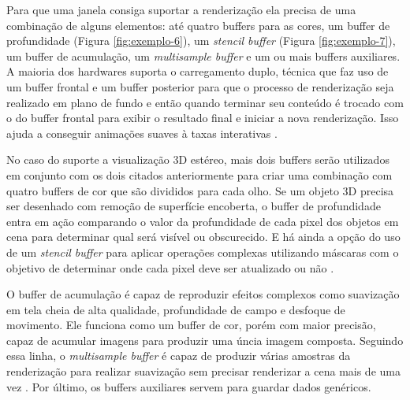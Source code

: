 Para que uma janela consiga suportar a renderização ela precisa de uma combinação de alguns elementos: até quatro buffers para as cores, um buffer de profundidade (Figura \ref{fig:exemplo-6}), um \textit{stencil buffer} (Figura \ref{fig:exemplo-7}), um buffer de acumulação, um \textit{multisample buffer} e um ou mais buffers auxiliares. A maioria dos hardwares suporta o carregamento duplo, técnica que faz uso de um buffer frontal e um buffer posterior para que o processo de renderização seja realizado em plano de fundo e então quando terminar seu conteúdo é trocado com o do buffer frontal para exibir o resultado final e iniciar a nova renderização. Isso ajuda a conseguir animações suaves à taxas interativas \cite{GLSLBook}.

\begin{figure}[h!]
	\centering
\end{figure}
\nocite{stcbuf}
	
No caso do suporte a visualização 3D estéreo, mais dois buffers serão utilizados em conjunto com os dois citados anteriormente para criar uma combinação com quatro buffers de cor que são divididos para cada olho. Se um objeto 3D precisa ser desenhado com remoção de superfície encoberta, o buffer de profundidade entra em ação comparando o valor da profundidade de cada pixel dos objetos em cena para determinar qual será visível ou obscurecido. E há ainda a opção do uso de um \textit{stencil buffer} para aplicar operações complexas utilizando máscaras com o objetivo de determinar onde cada pixel deve ser atualizado ou não \cite{GLSLBook}.

O buffer de acumulação é capaz de reproduzir efeitos complexos como suavização em tela cheia de alta qualidade, profundidade de campo e desfoque de movimento. Ele funciona como um buffer de cor, porém com maior precisão, capaz de acumular imagens para produzir uma úncia imagem composta. Seguindo essa linha, o \textit{multisample buffer} é capaz de produzir várias amostras da renderização para realizar suavização sem precisar renderizar a cena mais de uma vez \cite{GLSLBook}. Por último, os buffers auxiliares servem para guardar dados genéricos. 

